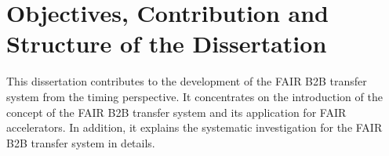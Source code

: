 %
%
%
%

\section{Objectives, Contribution and Structure of the Dissertation}
This dissertation contributes to the development of the FAIR B2B transfer system from the timing perspective. It concentrates on the introduction of the concept of the FAIR B2B transfer system and its application for FAIR accelerators. In addition, it explains the systematic investigation for the FAIR B2B transfer system in details.

